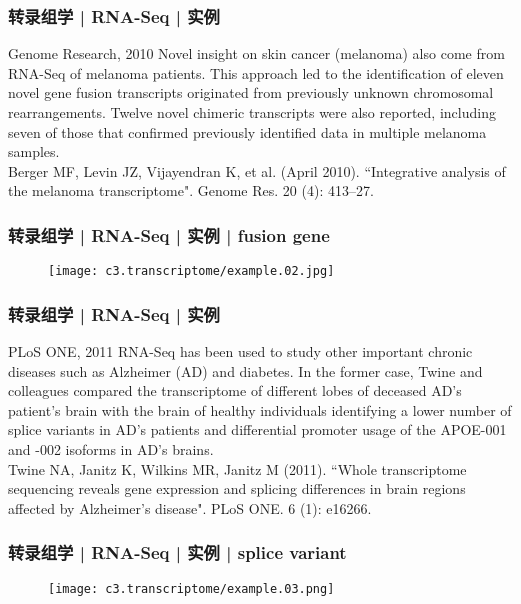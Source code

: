 \begin{frame}
  \frametitle{转录组学 | RNA-Seq | 实例}
  \begin{block}{Genome Research, 2010}
   Novel insight on skin cancer (melanoma) also come from RNA-Seq of melanoma patients. This approach led to the identification of eleven novel gene fusion transcripts originated from previously unknown chromosomal rearrangements. Twelve novel chimeric transcripts were also reported, including seven of those that confirmed previously identified data in multiple melanoma samples.\\
   \vspace{0.5em}
Berger MF, Levin JZ, Vijayendran K, et al. (April 2010). ``Integrative analysis of the melanoma transcriptome". Genome Res. 20 (4): 413–27. 
  \end{block}
\end{frame}

\begin{frame}
  \frametitle{转录组学 | RNA-Seq | 实例 | fusion gene}
  \begin{figure}
    \centering
    \texttt{[image: c3.transcriptome/example.02.jpg]}
  \end{figure}
\end{frame}

\begin{frame}
  \frametitle{转录组学 | RNA-Seq | 实例}
  \begin{block}{PLoS ONE, 2011}
  RNA-Seq has been used to study other important chronic diseases such as Alzheimer (AD) and diabetes. In the former case, Twine and colleagues compared the transcriptome of different lobes of deceased AD's patient's brain with the brain of healthy individuals identifying a lower number of splice variants in AD's patients and differential promoter usage of the APOE-001 and -002 isoforms in AD's brains.\\
  \vspace{0.5em}
Twine NA, Janitz K, Wilkins MR, Janitz M (2011). ``Whole transcriptome sequencing reveals gene expression and splicing differences in brain regions affected by Alzheimer's disease". PLoS ONE. 6 (1): e16266. 
  \end{block}
\end{frame}

\begin{frame}
  \frametitle{转录组学 | RNA-Seq | 实例 | splice variant}
  \begin{figure}
    \centering
    \texttt{[image: c3.transcriptome/example.03.png]}
  \end{figure}
\end{frame}

